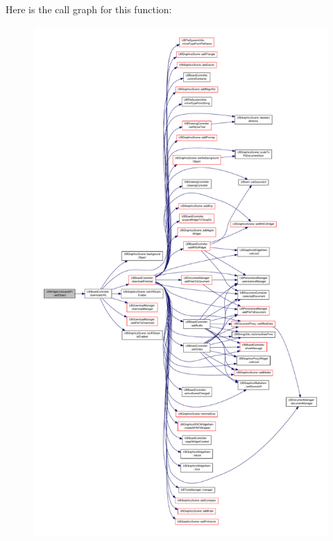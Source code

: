 Here is the call graph for this function\-:
\nopagebreak
\begin{figure}[H]
\begin{center}
\leavevmode
\includegraphics[height=550pt]{d5/d2b/class_u_b_widget_uniboard_a_p_i_a73ac1600ef3ed549d2c6c969436efb2f_cgraph}
\end{center}
\end{figure}



